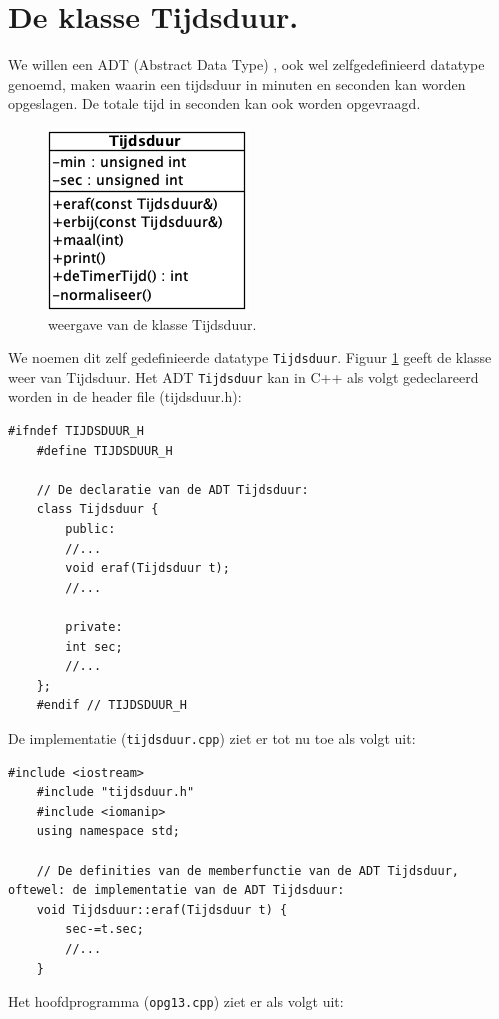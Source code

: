 \section{De klasse Tijdsduur.}

We willen een ADT (Abstract Data Type) , ook wel zelfgedefinieerd datatype genoemd, maken waarin een tijdsduur in minuten en seconden kan worden opgeslagen. De totale tijd in seconden kan ook worden opgevraagd. 
\begin{figure}[h!]
	\captionsetup{justification=centering}
	\includegraphics[width=0.28 \linewidth]{figuren/tijdsduur}
	\centering
	\caption{weergave van de klasse Tijdsduur. }
	\label{fig:tijdsduurKlas}
\end{figure}
We noemen dit zelf gedefinieerde datatype \texttt{Tijdsduur}. Figuur \ref{fig:tijdsduurKlas} geeft de klasse weer van Tijdsduur.
Het ADT \texttt{Tijdsduur} kan in C++ als volgt gedeclareerd worden in de header file (tijdsduur.h):

\begin{lstlisting}[caption= de headerfile van de klasse \texttt{Tijdsduur},label={lst:tijdsdHeader},numbers=none]		
	#ifndef TIJDSDUUR_H
	#define TIJDSDUUR_H
	
	// De declaratie van de ADT Tijdsduur:
	class Tijdsduur {
		public:
		//...
		void eraf(Tijdsduur t);
		//...
		
		private:
		int sec;
		//...
	};
	#endif // TIJDSDUUR_H
\end{lstlisting}

De implementatie (\texttt{tijdsduur.cpp}) ziet er tot nu toe als volgt uit:
\begin{lstlisting}[caption= de implementatiefile van de klasse \texttt{Tijdsduur},label={lst:tijdsdImpl},numbers=none]
	#include <iostream>
	#include "tijdsduur.h"
	#include <iomanip>
	using namespace std;
	
	// De definities van de memberfunctie van de ADT Tijdsduur, oftewel: de implementatie van de ADT Tijdsduur:
	void Tijdsduur::eraf(Tijdsduur t) {
		sec-=t.sec;
		//...
	}
\end{lstlisting}

Het hoofdprogramma (\texttt{opg13.cpp}) ziet er als volgt uit:


